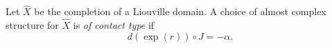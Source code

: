 
 
    Let $\hat X$ be the completion of a Liouville domain. A choice of almost complex structure for $\hat X$ is \emph{of contact type} if 
    \[d(\exp(r))\circ J = -\alpha.\]
    \label{def:contactTypeACS}
 